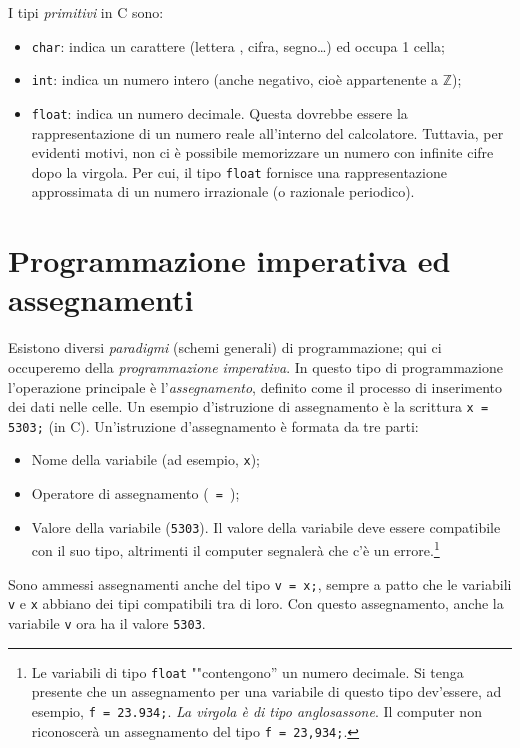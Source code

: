 I  tipi \emph{primitivi} in C sono:
\begin{itemize}
	\item
\lstinline!char!: indica un carattere (lettera , cifra, segno…) ed occupa 1 cella;
	\item
\lstinline!int!: indica un numero intero (anche negativo, cioè appartenente a $\mathbb{Z}$);
	\item

\lstinline!float!: indica un numero decimale. Questa dovrebbe essere la rappresentazione di un numero reale all'interno del calcolatore. Tuttavia, per evidenti motivi, non ci è possibile memorizzare un numero con infinite cifre dopo la virgola. Per cui, il tipo \lstinline!float! fornisce una rappresentazione approssimata di un numero irrazionale (o razionale periodico).
\end{itemize}

	\section{Programmazione imperativa ed assegnamenti}
Esistono diversi \emph{paradigmi} (schemi generali) di programmazione; qui ci occuperemo della \emph{programmazione imperativa}. In  questo tipo di programmazione l'operazione principale è l'\emph{assegnamento}, definito come il processo di inserimento dei dati nelle celle. Un esempio d'istruzione di assegnamento è la scrittura \lstinline!x = 5303;! (in C). Un'istruzione d'assegnamento è formata da tre parti:
\begin{itemize}
	\item
Nome della variabile (ad esempio, \lstinline!x!);
	\item
Operatore di assegnamento (\lstinline! = !);
	\item
Valore della variabile (\lstinline!5303!). Il valore della variabile deve essere compatibile con il suo tipo, altrimenti il computer segnalerà che c'è un errore.\footnote{Le variabili di tipo \lstinline!float! ""contengono'' un numero decimale. Si tenga presente che un assegnamento per una variabile di questo tipo dev'essere, ad esempio, \lstinline!f = 23.934;!. \emph{La virgola è di tipo anglosassone}. Il computer non riconoscerà un assegnamento del tipo \lstinline!f = 23,934;!.}
\end{itemize}
Sono ammessi assegnamenti anche del tipo \lstinline!v = x;!, sempre a patto che le variabili \lstinline!v! e \lstinline!x! abbiano dei tipi compatibili tra di loro. Con questo assegnamento, anche la variabile \lstinline!v! ora ha il valore \lstinline!5303!.

